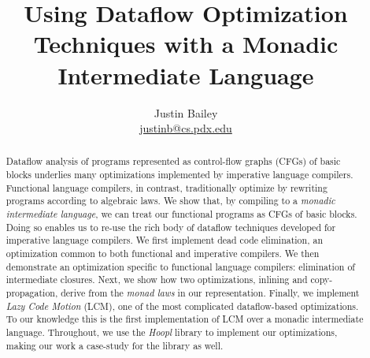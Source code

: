 \documentclass[12pt]{article}
\begin{document}
           {\doublespacing}{}

\newcommand{\authorEmail}{\url{justinb@cs.pdx.edu}}
%
           {\newcommand{\authorEmail}{\url{justinb@@cs.pdx.edu}}}%
           {}

\date{}
\author{Justin Bailey \\ \authorEmail}
\title{Using Dataflow Optimization Techniques with a Monadic Intermediate Language}

\maketitle 

\renewcommand{\abstractnamefont}{\normalfont\small\sffamily\bfseries}
\begin{abstract}
  Dataflow analysis of programs represented as control-flow graphs
  (CFGs) of basic blocks underlies many optimizations implemented by
  imperative language compilers. Functional language compilers, in
  contrast, traditionally optimize by rewriting programs according to
  algebraic laws. We show that, by compiling to a \emph{monadic
    intermediate language}, we can treat our functional programs as
  CFGs of basic blocks. Doing so enables us to re-use the rich body of
  dataflow techniques developed for imperative language compilers. We
  first implement dead code elimination, an optimization common to
  both functional and imperative compilers. We then demonstrate an
  optimization specific to functional language compilers: elimination
  of intermediate closures. Next, we show how two optimizations,
  inlining and copy-propagation, derive from the \emph{monad laws} in
  our representation. Finally, we implement \emph{Lazy Code Motion}
  (LCM), one of the most complicated dataflow-based optimizations. To
  our knowledge this is the first implementation of LCM over a monadic
  intermediate language. Throughout, we use the \emph{Hoopl} library
  to implement our optimizations, making our work a case-study for the
  library as well.
\end{abstract}
\end{document}
